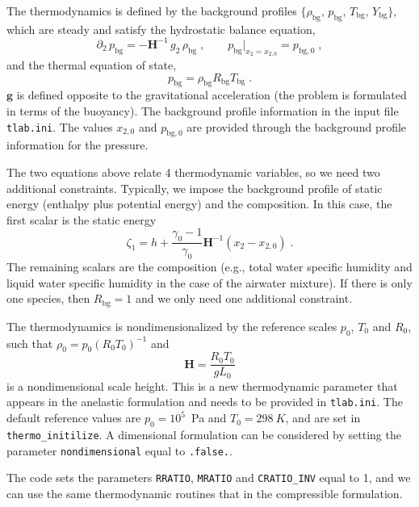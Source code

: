 The thermodynamics is defined by the background profiles $\{\rho_\mathrm{bg},\, p_\mathrm{bg},\, T_\mathrm{bg},\, Y_\mathrm{bg}\}$, which are steady and satisfy the hydrostatic balance equation,
\begin{equation}
    \partial_2\,p_\mathrm{bg}=-\mathbf{H}^{-1}\, g_2\,\rho_\mathrm{bg}\;,\qquad p_\mathrm{bg}|_{x_2=x_{2,0}}=p_{\mathrm{bg},0}\;,
\end{equation}
and the thermal equation of state,
\begin{equation}
    p_\mathrm{bg}  = \rho_\mathrm{bg} R_\mathrm{bg} T_\mathrm{bg} \;.
\end{equation}
$\mathbf{g}$ is defined opposite to the gravitational acceleration (the problem is formulated in terms of the buoyancy). The background profile information in the input file {\tt tlab.ini}. The values $x_{2,0}$ and $p_\mathrm{bg,0}$ are provided through the background profile information for the pressure. 

The two equations above relate 4 thermodynamic variables, so we need two additional constraints. Typically, we impose the background profile of static energy (enthalpy plus potential energy) and the composition. In this case, the first scalar is the static energy
\begin{equation}
    \zeta_1 = h + \frac{\gamma_0-1}{\gamma_0}\mathbf{H}^{-1}(x_2-x_{2,0}) \;.
\end{equation}
The remaining scalars are the composition (e.g., total water specific humidity and liquid water specific humidity in the case of the airwater mixture). If there is only one species, then $R_\mathrm{bg}=1$ and we only need one additional constraint. 

The thermodynamics is nondimensionalized by the reference scales $p_0$, $T_0$ and $R_0$, such that $\rho_0=p_0(R_0T_0)^{-1}$ and
\begin{equation}
    \mathbf{H} = \frac{R_0T_0}{gL_0}
\end{equation}
is a nondimensional scale height. This is a new thermodynamic parameter that appears in the anelastic formulation and needs to be provided in \texttt{tlab.ini}. The default reference values are $p_0=10^5$~Pa and $T_0=298~K$, and are set in \texttt{thermo\_initilize}. A dimensional formulation can be considered by setting the parameter \texttt{nondimensional} equal to \texttt{.false.}.

The code sets the parameters \texttt{RRATIO}, \texttt{MRATIO} and \texttt{CRATIO\_INV} equal to 1, and we can use the same thermodynamic routines that in the compressible formulation. %

